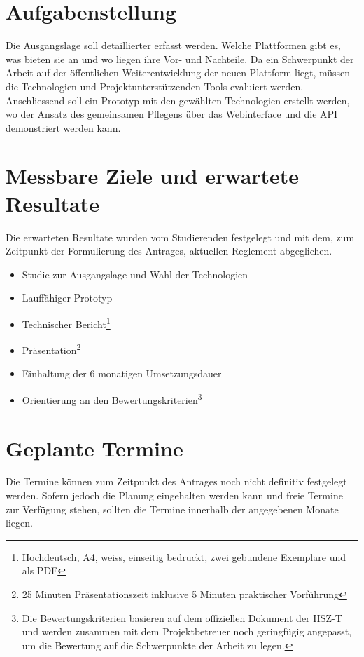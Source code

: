 \documentclass[]{scrreprt}
\begin{document}
    \section{Aufgabenstellung}
    Die Ausgangslage soll detaillierter erfasst werden. Welche Plattformen
    gibt es, was bieten sie an und wo liegen ihre Vor- und Nachteile.
    Da ein Schwerpunkt der Arbeit auf der öffentlichen Weiterentwicklung der
    neuen Plattform liegt, müssen die Technologien und Projektunterstützenden 
    Tools evaluiert werden.
    Anschliessend soll ein Prototyp mit den gewählten Technologien erstellt
    werden, wo der Ansatz des gemeinsamen Pflegens über das Webinterface und 
    die API demonstriert werden kann.

    \section{Messbare Ziele und erwartete Resultate}
    Die erwarteten Resultate wurden vom Studierenden festgelegt und mit dem, 
    zum Zeitpunkt der Formulierung des Antrages, aktuellen 
    Reglement\cite{reglement} abgeglichen.
    
    \begin{itemize}
    	\item Studie zur Ausgangslage und Wahl der Technologien
    	\item Lauffähiger Prototyp
    	\item Technischer Bericht\footnote{Hochdeutsch, A4, weiss, einseitig 
    	    bedruckt, zwei gebundene Exemplare und als PDF}
        \item Präsentation\footnote{25 Minuten Präsentationszeit inklusive 5 
            Minuten praktischer Vorführung}
        \item Einhaltung der 6 monatigen Umsetzungsdauer
        \item Orientierung an den Bewertungskriterien\footnote{Die 
            Bewertungskriterien basieren auf dem offiziellen 
            Dokument\cite{bewertungskriterien} der HSZ-T und werden zusammen 
            mit dem Projektbetreuer noch geringfügig angepasst, um die
            Bewertung auf die Schwerpunkte der Arbeit zu legen.}
    \end{itemize}

    \section{Geplante Termine}
    Die Termine können zum Zeitpunkt des Antrages noch nicht definitiv 
    festgelegt werden. Sofern jedoch die Planung eingehalten werden kann und 
    freie Termine zur Verfügung stehen, sollten die Termine innerhalb der 
    angegebenen Monate liegen.
\end{document}
